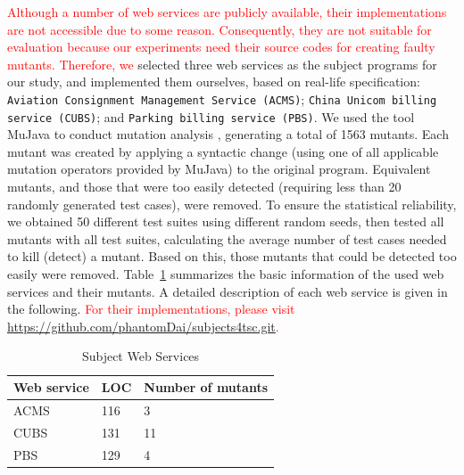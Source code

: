 \documentclass[10pt,journal,compsoc]{IEEEtran}
\begin{document}
\textcolor{red}{Although a number of web services are publicly available, their implementations are not accessible due to some reason. Consequently, they are not suitable for evaluation because our experiments need their source codes for creating faulty mutants. Therefore, we} selected three web services as the subject programs for our study, and implemented them ourselves, based on real-life specification:
\texttt{Aviation Consignment Management Service (ACMS)};
\texttt{China Unicom billing service (CUBS)}; and
\texttt{Parking billing service (PBS)}. We used the tool MuJava \cite{ma2005mujava} to conduct mutation analysis \cite{demillo1978hints, chen2018test, mao2017out, chen2017similarity}, generating a total of 1563 mutants. Each mutant was created by applying a syntactic change (using one of all applicable mutation operators provided by MuJava) to the original program. Equivalent mutants, and those that were too easily detected
(requiring less than 20 randomly generated test cases), were removed.
To ensure the statistical reliability, we obtained 50 different test suites using different random seeds, then tested all mutants with all test suites, calculating the average number of test cases needed to kill (detect) a mutant. Based on this, those mutants that could be detected too easily were removed. Table~\ref{tab:objects} summarizes the basic information of the used web services and their mutants.
A detailed description of each web service is given in the following. \textcolor{red}{
For their implementations, please visit \url{https://github.com/phantomDai/subjects4tsc.git}.}

\begin{table}[h]
\caption{Subject Web Services}
\label{tab:objects}
\centering
\begin{tabular}{lll} \toprule
  Web service                            &LOC                            &Number of mutants    \\ \midrule
  ACMS                                   &116                            &3                                    \\
  CUBS                                   &131                            &11                                  \\
  PBS                                    &129                            &4                                   \\ \bottomrule
\end{tabular}

\end{table}
\end{document}
